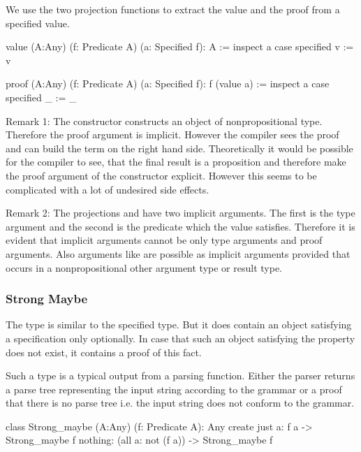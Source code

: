 We use the two projection functions to extract the value and the proof from a
specified value.

\begin{alba}
  value (A:Any) (f: Predicate A) (a: Specified f): A
    := inspect
         a
       case
         specified v := v

  proof (A:Any) (f: Predicate A) (a: Specified f): f (value a)
    := inspect
         a
       case
         specified _ := _
\end{alba}

Remark 1: The constructor  constructs an object of
nonpropositional type. Therefore the proof argument is implicit. However the
compiler sees the proof and can build the term on the right hand
side. Theoretically it would be possible for the compiler to see, that the
final result is a proposition and therefore make the proof argument of the
constructor  explicit. However this seems to be complicated
with a lot of undesired side effects.


Remark 2: The projections  and  have two implicit
arguments. The first is the type argument and the second is the predicate
which the value satisfies. Therefore it is evident that implicit arguments
cannot be only type arguments and proof arguments. Also arguments like
 are possible as implicit arguments provided that 
occurs in a nonpropositional other argument type or result type.


\vskip 2mm





\subsubsection{Strong Maybe}

The type  is similar to the specified type. But it does
contain an object satisfying a specification only optionally. In case that
such an object satisfying the property does not exist, it contains a proof of
this fact.

Such a type is a typical output from a parsing function. Either the parser
returns a parse tree representing the input string according to the grammar or
a proof that there is no parse tree i.e. the input string does not conform to
the grammar.

\begin{alba}
   class
     Strong_maybe (A:Any) (f: Predicate A): Any
   create
     just a:  f a -> Strong_maybe f
     nothing: (all a: not (f a)) -> Strong_maybe f
\end{alba}




